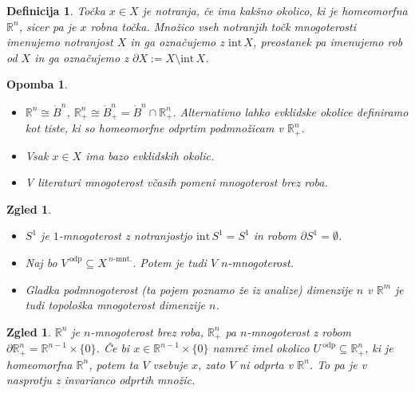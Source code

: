 \documentclass[10pt, a4paper]{article}
\newtheorem{defi}[izr]{Definicija}
\newenvironment{noticeB}{%
  \tcolorbox[%
  notitle,
  empty,
  enhanced,  %
  breakable,
  coltext=black,
  colback=white, 
  fontupper=\rmfamily,
  noparskip,
  sharp corners,
  boxrule=-1pt,  %
  frame hidden,
  left=7pt,  %
  right=7pt,
  top=5pt,
  bottom=5pt,
  before skip=2.5ex plus 2pt,
  after skip=2.5ex plus 2pt,
  borderline west = {1.5pt}{-0.1pt}{blue!30!black}, %
  overlay unbroken and last={%
    \draw[color=black, line width=1.25pt]
    ($(frame.south west)+(1.pt, -0.1pt)$) -- ++(2em, 0);
  }
  ]}
{\endtcolorbox}
\newenvironment{definicija}{\begin{noticeB}\begin{defi}}{%
\end{defi}\end{noticeB}}
\newtheorem*{opomba}{Opomba}
\newtheorem{zgled}[izr]{Zgled}
\newcommand{\R}{\mathbb {R}}
\newcommand{\intem}{\mathrm{int}\,}
\begin{document}
\begin{definicija}
  Točka $x \in X$ je notranja, če ima kakšno okolico, ki je homeomorfna $\R^n$,
  sicer pa je $x$ robna točka. Množico vseh notranjih točk mnogoterosti 
  imenujemo notranjost $X$ in ga označujemo z $\intem X$, preostanek pa imenujemo rob od $X$
  in ga označujemo z $\partial X := X \setminus \intem X$. 
\end{definicija}

\begin{opomba}
  \begin{itemize}
    \item $\R^n \cong \mathring{B}^n$, $\R^n_+ \cong \mathring{B}^n_+ = \mathring{B}^n \cap \R^n _+.$
    Alternativno lahko evklidske okolice definiramo kot tiste, ki so homeomorfne odprtim podmnožicam v $\R^n_+$.
    \item Vsak $x \in X$ ima bazo evklidskih okolic.
    \item V literaturi mnogoterost včasih pomeni mnogoterost brez roba.
  \end{itemize}
\end{opomba}

\begin{zgled}
  \begin{itemize}
    \item $S^1$ je $1$-mnogoterost z notranjostjo $\intem S^1 = S^1$ in robom $\partial S^1 = \emptyset$.
    \item Naj bo $V^{\ \text{odp}} \subseteq X^{\ \text{$n$-mnt.}}$. Potem je tudi $V$ $n$-mnogoterost.
    \item Gladka podmnogoterost (ta pojem poznamo že iz analize) dimenzije $n$ v $\R^m$ je tudi topološka 
    mnogoterost dimenzije $n$.
  \end{itemize}
\end{zgled}

\begin{zgled}
$\R^n$ je $n$-mnogoterost brez roba, $\R^n_+$ pa $n$-mnogoterost z robom $\partial \R^n_+ = \R^{n - 1} \times \{0\}$.
    Če bi $x \in \R^{n - 1} \times \{0\}$ namreč imel okolico $U^{\ \text{odp}}\subseteq \R^n_+$, ki je homeomorfna $\R^n$,
    potem ta $V$ vsebuje $x$, zato $V$ ni odprta v $\R^n$. To pa je v nasprotju z invarianco odprtih množic.  
\end{zgled}
  
\end{document}
